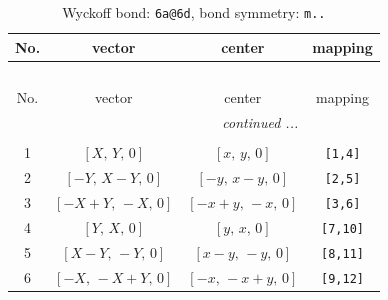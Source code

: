 \documentclass[fleqn,8pt]{jsarticle}
\begin{document}
\begin{longtable}{cccc}
\caption{Wyckoff bond: {\tt 6a@6d}, bond symmetry: {\tt m..}}
 \\
 \hline \hline
No. & vector & center & mapping \\ \hline \endfirsthead

\multicolumn{3}{l}{\tablename\ \thetable{}} \\
 \hline \hline
No. & vector & center & mapping \\ \hline \endhead

 \hline \hline
\multicolumn{3}{r}{\footnotesize\it continued ...} \\ \endfoot

 \hline \hline
\multicolumn{3}{r}{} \\ \endlastfoot

1 & $\left[ X,\, Y,\, 0 \right]$ & $\left[ x,\, y,\, 0 \right]$ & {\tt [1,4]} \\ \hline
2 & $\left[ - Y,\, X - Y,\, 0 \right]$ & $\left[ - y,\, x - y,\, 0 \right]$ & {\tt [2,5]} \\ \hline
3 & $\left[ - X + Y,\, - X,\, 0 \right]$ & $\left[ - x + y,\, - x,\, 0 \right]$ & {\tt [3,6]} \\ \hline
4 & $\left[ Y,\, X,\, 0 \right]$ & $\left[ y,\, x,\, 0 \right]$ & {\tt [7,10]} \\ \hline
5 & $\left[ X - Y,\, - Y,\, 0 \right]$ & $\left[ x - y,\, - y,\, 0 \right]$ & {\tt [8,11]} \\ \hline
6 & $\left[ - X,\, - X + Y,\, 0 \right]$ & $\left[ - x,\, - x + y,\, 0 \right]$ & {\tt [9,12]} \\
\end{longtable}
\renewcommand{\arraystretch}{1.2}
\end{document}
